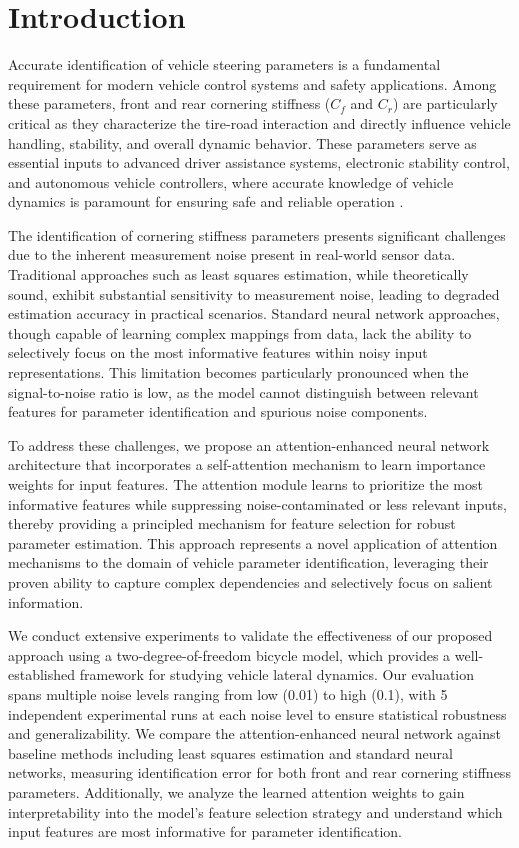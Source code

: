 \documentclass[Afour,sageh,times]{sagej}
\begin{document}
\section{Introduction}
\label{sec:intro}

Accurate identification of vehicle steering parameters is a fundamental requirement for modern vehicle control systems and safety applications. Among these parameters, front and rear cornering stiffness ($C_f$ and $C_r$) are particularly critical as they characterize the tire-road interaction and directly influence vehicle handling, stability, and overall dynamic behavior. These parameters serve as essential inputs to advanced driver assistance systems, electronic stability control, and autonomous vehicle controllers, where accurate knowledge of vehicle dynamics is paramount for ensuring safe and reliable operation \citep{rajamani2012vehicle}.

The identification of cornering stiffness parameters presents significant challenges due to the inherent measurement noise present in real-world sensor data. Traditional approaches such as least squares estimation, while theoretically sound, exhibit substantial sensitivity to measurement noise, leading to degraded estimation accuracy in practical scenarios. Standard neural network approaches, though capable of learning complex mappings from data, lack the ability to selectively focus on the most informative features within noisy input representations. This limitation becomes particularly pronounced when the signal-to-noise ratio is low, as the model cannot distinguish between relevant features for parameter identification and spurious noise components.

To address these challenges, we propose an attention-enhanced neural network architecture that incorporates a self-attention mechanism to learn importance weights for input features. The attention module learns to prioritize the most informative features while suppressing noise-contaminated or less relevant inputs, thereby providing a principled mechanism for feature selection for robust parameter estimation. This approach represents a novel application of attention mechanisms to the domain of vehicle parameter identification, leveraging their proven ability to capture complex dependencies and selectively focus on salient information.

We conduct extensive experiments to validate the effectiveness of our proposed approach using a two-degree-of-freedom bicycle model, which provides a well-established framework for studying vehicle lateral dynamics. Our evaluation spans multiple noise levels ranging from low (0.01) to high (0.1), with 5 independent experimental runs at each noise level to ensure statistical robustness and generalizability. We compare the attention-enhanced neural network against baseline methods including least squares estimation and standard neural networks, measuring identification error for both front and rear cornering stiffness parameters. Additionally, we analyze the learned attention weights to gain interpretability into the model's feature selection strategy and understand which input features are most informative for parameter identification.
\end{document}
